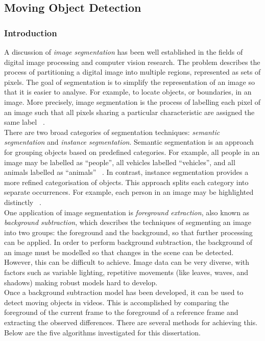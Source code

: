\setlength{\leftskip}{0cm}




\subsection{Moving Object Detection}
\label{sec:movingObjectDetection}
\subsubsection{Introduction}
\setlength{\leftskip}{0.5cm}
\indent \indent
A discussion of \textit{image segmentation} has been well established in the fields of digital image processing and computer vision research. The problem describes the process of partitioning a digital image into multiple regions, represented as sets of pixels. The goal of segmentation is to simplify the representation of an image so that it is easier to analyse. For example, to locate objects, or boundaries, in an image. More precisely, image segmentation is the process of labelling each pixel of an image such that all pixels sharing a particular characteristic are assigned the same label ~\cite{Shapiro}.
\smallskip \\ \indent
There are two broad categories of segmentation techniques: \textit{semantic segmentation} and \textit{instance segmentation}. Semantic segmentation is an approach for grouping objects based on predefined categories. For example, all people in an image may be labelled as ``people'', all vehicles labelled ``vehicles'', and all animals labelled as ``animals'' ~\cite{Semantic}.  In contrast, instance segmentation provides a more refined categorisation of objects. This approach splits each category into separate occurrences. For example, each person in an image may be highlighted distinctly ~\cite{Instance}.
\smallskip \\ \indent
One application of image segmentation is \textit{foreground extraction}, also known as \textit{background subtraction}, which describes the techniques of segmenting an image into two groups: the foreground and the background, so that further processing can be applied. In order to perform background subtraction, the background of an image must be modelled so that changes in the scene can be detected. However, this can be difficult to achieve. Image data can be very diverse, with factors such as variable lighting, repetitive movements (like leaves, waves, and shadows) making robust models hard to develop.
\smallskip \\ \indent
Once a background subtraction model has been developed, it can be used to detect moving objects in videos. This is accomplished by comparing the foreground of the current frame to the foreground of a reference frame and extracting the observed differences. There are several methods for achieving this. Below are the five algorithms investigated for this dissertation.


